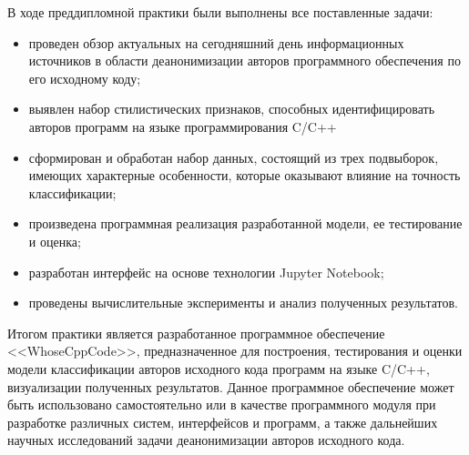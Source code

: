 В ходе преддипломной практики были выполнены все поставленные задачи:
\begin{itemize}
 \item проведен обзор актуальных на сегодняшний день информационных источников в области деанонимизации
 авторов программного обеспечения по его исходному коду;
 \item выявлен набор стилистических признаков, способных идентифицировать авторов программ на языке программирования
 C/C++
 \item сформирован и обработан набор данных, состоящий из трех подвыборок, имеющих характерные особенности,
 которые оказывают влияние на точность классификации;
 \item произведена программная реализация разработанной модели, ее тестирование и оценка;
 \item разработан интерфейс на основе технологии Jupyter Notebook;
 \item проведены вычислительные эксперименты и анализ полученных результатов.
\end{itemize}

Итогом практики является разработанное программное обеспечение <<WhoseCppCode>>, предназначенное для построения,
тестирования и оценки модели классификации авторов исходного кода программ на языке C/C++,
визуализации полученных результатов. Данное программное обеспечение может быть использовано самостоятельно
или в качестве программного модуля при разработке различных систем, интерфейсов и программ, а также дальнейших
научных исследований задачи деанонимизации авторов исходного кода. 


